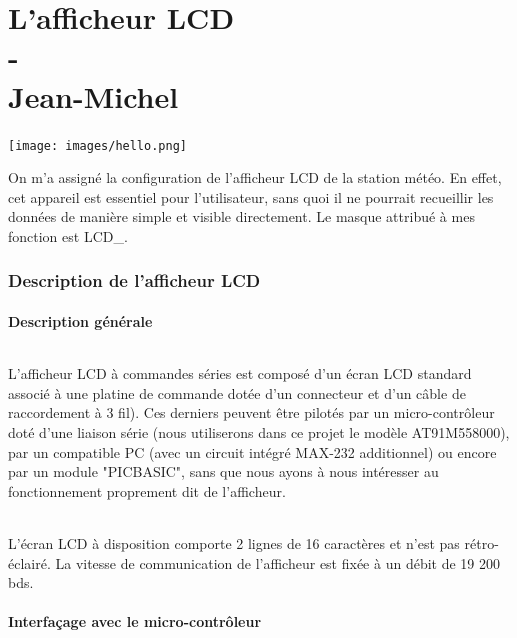 \documentclass[a4paper]{report}
\begin{document}
\part{L'afficheur LCD\\-\\Jean-Michel }
\texttt{[image: images/hello.png]}

On m'a assigné la configuration de l'afficheur LCD de la station météo. En effet, cet appareil est essentiel pour l'utilisateur, sans quoi il ne pourrait recueillir les données de manière simple et visible directement. Le masque attribué à mes fonction est LCD\_.

\section{Description de l'afficheur LCD}
\subsection{Description générale}
	 			\paragraph{}
      				L'afficheur LCD à commandes séries est composé d'un écran LCD standard associé à une platine de commande dotée d'un connecteur et d'un câble de raccordement à 3 fil). Ces derniers peuvent être pilotés par un micro-contrôleur doté d'une liaison série (nous utiliserons dans ce projet le modèle AT91M558000), par un compatible PC (avec un circuit intégré MAX-232 additionnel) ou encore par un module "PICBASIC", sans que nous ayons à nous intéresser au fonctionnement proprement dit de l'afficheur.
      			\paragraph{}
      				L'écran LCD à disposition comporte 2 lignes de 16 caractères et n'est pas rétro-éclairé. La vitesse de communication de l'afficheur est fixée à un débit de 19 200 bds.
      	\subsection{Interfaçage avec le micro-contrôleur}
\end{document}
